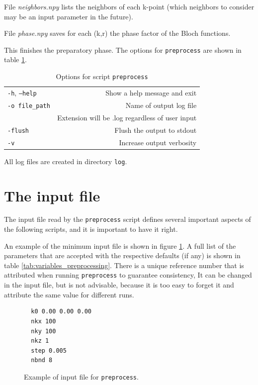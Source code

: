 \documentclass[a4paper,12pt]{report}
\begin{document}
File \emph{neighbors.npy} lists the neighbors of each k-point
(which neighbors to consider may be an input parameter in the future).

File \emph{phase.npy} saves for each (k,r) the phase factor of the Bloch functions.

This finishes the preparatory phase.
The options for \texttt{preprocess} are shown in table \ref{tab:options_preprocess}.

\begin{table}[ht]
 \centering
 \caption{Options for script \texttt{preprocess}}\label{tab:options_preprocess}
\begin{tabular}[]{lr}
\hline
  \texttt{-h}, \texttt{--help}  &\hspace*{2cm} Show a help message and exit \\
  \texttt{-o file\_path}        & Name of output log file\\
                                & Extension will be .log regardless of user input \\
  \texttt{-flush}               & Flush the output to stdout \\
  \texttt{-v}                   & Increase output verbosity \\
  \hline
\end{tabular}
\end{table}

All log files are created in directory \verb|log|.




 \section{The input file}

 The input file read by the \texttt{preprocess} script defines several important
 aspects of the following scripts, and it is important to have it right.

 An example of the minimum input file is shown in figure \ref{code:inputfile}.
 A full list of the parameters that are accepted with the respective defaults (if any)
 is shown in table \ref{tab:variables_preprocessing}.
 There is a unique reference number that is attributed when running \texttt{preprocess} to guarantee consistency,
 It can be changed in the input file, but is not advisable,
 because it is too easy to forget it
 and attribute the same value for different runs.

\begin{figure}[ht]
 \centering
\begin{verbatim}
  k0 0.00 0.00 0.00
  nkx 100
  nky 100
  nkz 1
  step 0.005
  nbnd 8
\end{verbatim}
\caption{Example of input file for \texttt{preprocess}.}
\label{code:inputfile}
\end{figure}
\end{document}

